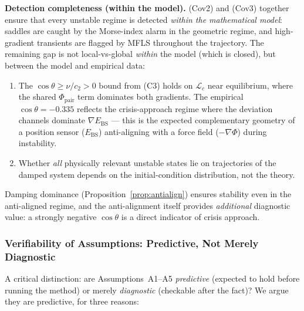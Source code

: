 \documentclass[11pt,a4paper]{article}
\newcommand{\Ebs}{E_{\mathrm{BS}}}
\newcommand{\grad}{\nabla}
\begin{document}
\noindent
\textbf{Detection completeness (within the model).}
(Cov2) and (Cov3) together ensure that every unstable regime
is detected \emph{within the mathematical model}: saddles are
caught by the Morse-index alarm in the geometric regime, and
high-gradient transients are flagged by MFLS throughout the
trajectory.  The remaining gap is not local-vs-global
\emph{within} the model (which is closed), but between the
model and empirical data:
\begin{enumerate}[nosep]
  \item The $\cos\theta \ge \nu/c_2 > 0$ bound from (C3) holds
    on $\mathcal{L}_c$ near equilibrium, where the shared
    $\Phi_{\mathrm{pair}}$ term dominates both gradients.
    The empirical $\cos\theta = -0.335$ reflects the
    crisis-approach regime where the deviation channels dominate
    $\grad\Ebs$ --- this is the expected complementary geometry
    of a position sensor ($\Ebs$) anti-aligning with a force
    field ($-\grad\Phi$) during instability.
  \item Whether \emph{all} physically relevant unstable states
    lie on trajectories of the damped system depends on the
    initial-condition distribution, not the theory.
\end{enumerate}
Damping dominance (Proposition~\ref{prop:antialign}) ensures
stability even in the anti-aligned regime, and the anti-alignment
itself provides \emph{additional} diagnostic value: a strongly
negative $\cos\theta$ is a direct indicator of crisis approach.

\subsubsection{Verifiability of Assumptions: Predictive, Not
Merely Diagnostic}

A critical distinction: are Assumptions~A1--A5 \emph{predictive}
(expected to hold before running the method) or merely
\emph{diagnostic} (checkable after the fact)?  We argue they are
predictive, for three reasons:
\end{document}
